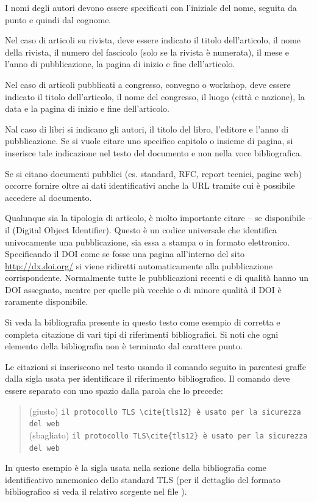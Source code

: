 I nomi degli autori devono essere specificati con l'iniziale del nome, seguita da punto e quindi dal cognome.

Nel caso di articoli su rivista, deve essere indicato il titolo dell'articolo, il nome della rivista, il numero del fascicolo (solo se la rivista è numerata), il mese e l'anno di pubblicazione,  la pagina di inizio e fine dell'articolo.

Nel caso di articoli pubblicati a congresso, convegno o workshop, deve essere indicato il titolo dell'articolo, il nome del congresso, il luogo (città e nazione), la data e la pagina di inizio e fine dell'articolo.

Nal caso di libri si indicano gli autori, il titolo del libro, l'editore e l'anno di pubblicazione. Se si vuole citare uno specifico capitolo o insieme di pagina, si inserisce tale indicazione nel testo del documento e non nella voce bibliografica.

Se si citano documenti pubblici (es. standard, RFC, report tecnici, pagine web) occorre fornire oltre ai dati identificativi anche la URL tramite cui è possibile accedere al documento.

Qualunque sia la tipologia di articolo, è molto importante citare -- se disponibile -- il  (Digital Object Identifier). Questo è un codice universale che identifica univocamente una pubblicazione, sia essa a stampa o in formato elettronico. Specificando il DOI come se fosse una pagina all'interno del sito \url{http://dx.doi.org/} si viene ridiretti automaticamente alla pubblicazione corrispondente. Normalmente tutte le pubblicazioni recenti e di qualità hanno un DOI assegnato, mentre per quelle più vecchie o di minore qualità il DOI è raramente disponibile.

Si veda la bibliografia presente in questo testo come esempio di corretta e completa citazione di vari tipi di riferimenti bibliografici.
Si noti che ogni elemento della bibliografia non è terminato dal carattere punto.

Le citazioni si inseriscono nel testo usando il comando  seguito in parentesi graffe dalla sigla usata per identificare il riferimento bibliografico. Il comando  deve essere separato con uno spazio dalla parola che lo precede:
\begin{quote}
(giusto) \verb+il protocollo TLS \cite{tls12} è usato per la sicurezza del web+
\\
(sbagliato) \verb+il protocollo TLS\cite{tls12} è usato per la sicurezza del web+
\end{quote}
In questo esempio  è la sigla usata nella sezione della bibliografia come identificativo mnemonico dello standard TLS (per il dettaglio del formato bibliografico si veda il relativo sorgente nel file ).

